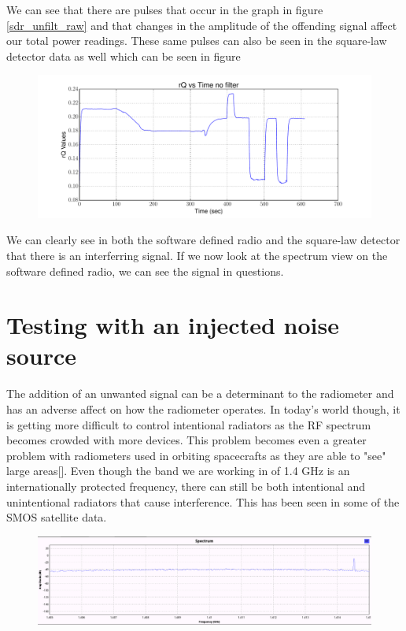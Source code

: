 We can see that there are pulses that occur in the graph in figure \ref{sdr_unfilt_raw} and that changes in the amplitude of the offending signal affect our total power readings.  These same pulses can also be seen in the square-law detector data as well which can be seen in figure 

\begin{figure}[h!tb] \centering

\includegraphics[width=\textwidth]{Experiments/Exp4/sdr_raw_unfiltered.pdf}

\label{labview_tpr}
\end{figure}

We can clearly see in both the software defined radio and the square-law detector that there is an interferring signal.  If we now look at the spectrum view on the software defined radio, we can see the signal in questions.



\section{Testing with an injected noise source}
The addition of an unwanted signal can be a determinant to the radiometer and has an adverse affect on how the radiometer operates.  In today's world though, it is getting more difficult to control intentional radiators as the RF spectrum becomes crowded with more devices.  This problem becomes even a greater problem with radiometers used in orbiting spacecrafts as they are able to "see" large areas[\cite{DeRooRFI}].  Even though the band we are working in of 1.4 GHz is an internationally protected frequency, there can still be both intentional and unintentional radiators that cause interference.  This has been seen in some of the SMOS satellite data.

\begin{figure}[h!tb] \centering

\includegraphics[width=\textwidth]{Images/interfering_signal_edit.png}

\label{inter_signal}
\end{figure}

